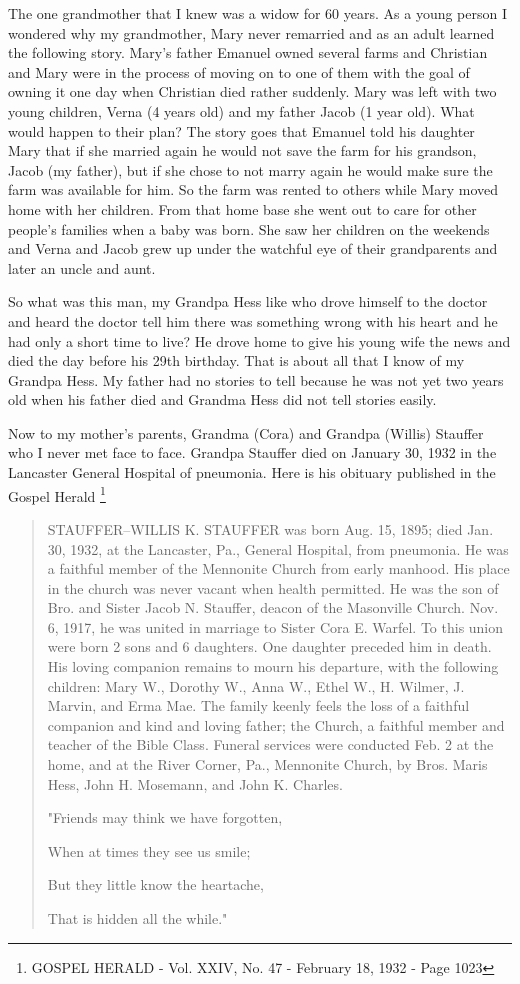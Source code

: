 The one grandmother that I knew was a widow for 60 years.
As a young person I wondered why my grandmother, Mary never remarried and as an adult learned the following story.
Mary's father Emanuel owned several farms and Christian and Mary were in the process of moving on to one of them with the goal of owning it one day when Christian died rather suddenly.
Mary was left with two young children, Verna (4 years old) and my father Jacob (1 year old).
What would happen to their plan? The story goes that Emanuel told his daughter Mary that if she married again he would not save the farm for his grandson, Jacob (my father), but if she chose to not marry again he would make sure the farm was available for him.
So the farm was rented to others while Mary moved home with her children.
From that home base she went out to care for other people's families when a baby was born.
She saw her children on the weekends and Verna and Jacob grew up under the watchful eye of their grandparents and later an uncle and aunt.


So what was this man, my Grandpa Hess like who drove himself to the doctor and heard the doctor tell him there was something wrong with his heart and he had only a short time to live? He drove home to give his young wife the news and died the day before his 29th birthday.
That is about all that I know of my Grandpa Hess.
My father had no stories to tell because he was not yet two years old when his father died and Grandma Hess did not tell stories easily.

Now to my mother's parents, Grandma (Cora) and Grandpa (Willis) Stauffer who I never met face to face. Grandpa Stauffer died on January 30, 1932 in the Lancaster General Hospital of pneumonia. Here is his obituary published in the Gospel Herald \footnote{GOSPEL HERALD - Vol. XXIV, No. 47 - February 18, 1932 - Page 1023}
\begin{quotation}
STAUFFER--WILLIS K. STAUFFER was born Aug. 15, 1895; died Jan. 30, 1932, at the Lancaster, Pa., General Hospital, from pneumonia. He was a faithful member of the Mennonite Church from early manhood. His place in the church was never vacant when health permitted. He was the son of Bro. and Sister Jacob N. Stauffer, deacon of the Masonville Church. Nov. 6, 1917, he was united in marriage to Sister Cora E. Warfel. To this union were born 2 sons and 6 daughters. One daughter preceded him in death. His loving companion remains to mourn his departure, with the following children: Mary W., Dorothy W., Anna W., Ethel W., H. Wilmer, J. Marvin, and Erma Mae. The family keenly feels the loss of a faithful companion and kind and loving father; the Church, a faithful member and teacher of the Bible Class. Funeral services were conducted Feb. 2 at the home, and at the River Corner, Pa., Mennonite Church, by Bros. Maris Hess, John H. Mosemann, and John K. Charles.

"Friends may think we have forgotten,

When at times they see us smile;

But they little know the heartache,

That is hidden all the while."

\end{quotation}

